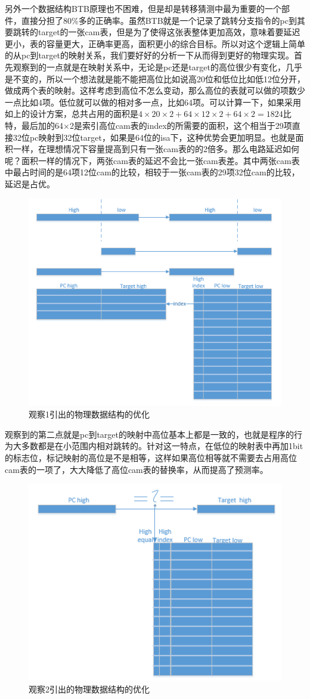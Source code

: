 \documentclass[11pt]{article}
\begin{document}
另外一个数据结构BTB原理也不困难，但是却是转移猜测中最为重要的一个部件，直接分担了80\%多的正确率。虽然BTB就是一个记录了跳转分支指令的pc到其要跳转的target的一张cam表，但是为了使得这张表整体更加高效，意味着要延迟更小，表的容量更大，正确率更高，面积更小的综合目标。所以对这个逻辑上简单的从pc到target的映射关系，我们要好好的分析一下从而得到更好的物理实现。首先观察到的一点就是在映射关系中，无论是pc还是target的高位很少有变化，几乎是不变的，所以一个想法就是能不能把高位比如说高20位和低位比如低12位分开，做成两个表的映射。这样考虑到高位不怎么变动，那么高位的表就可以做的项数少一点比如4项。低位就可以做的相对多一点，比如64项。可以计算一下，如果采用如上的设计方案，总共占用的面积是$ 4\times20\times2 + 64\times12\times2 + 64\times2 = 1824 $比特，最后加的64×2是索引高位cam表的index的所需要的面积，这个相当于29项直接32位pc映射到32位target，如果是64位的isa下，这种优势会更加明显。也就是面积一样，在理想情况下容量提高到只有一张cam表的的2倍多。那么电路延迟如何呢？面积一样的情况下，两张cam表的延迟不会比一张cam表差。其中两张cam表中最占时间的是64项12位cam的比较，相较于一张cam表的29项32位cam的比较，延迟是占优。
\begin{figure}[H]
	\centering
	\includegraphics[width=0.45\linewidth]{figs/btb1.png}
	\caption{观察1引出的物理数据结构的优化}
\end{figure}
观察到的第二点就是pc到target的映射中高位基本上都是一致的，也就是程序的行为大多数都是在小范围内相对跳转的。针对这一特点，在低位的映射表中再加1bit的标志位，标记映射的高位是不是相等，这样如果高位相等就不需要去占用高位cam表的一项了，大大降低了高位cam表的替换率，从而提高了预测率。
\begin{figure}[H]
	\centering
	\includegraphics[width=\linewidth/2]{figs/btb2.png}
	\caption{观察2引出的物理数据结构的优化}
\end{figure}
\end{document}
